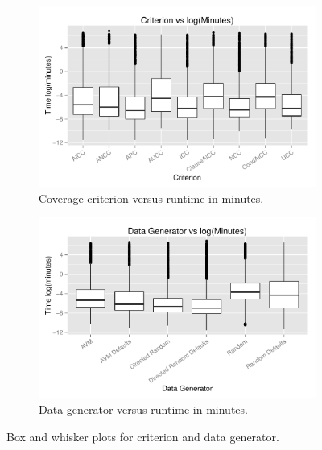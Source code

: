 

\begin{figure}
\centering
\begin{subfigure}{0.5\textwidth}
  \centering
  \includegraphics[width=1\linewidth]{diagrams/CriterionvsTime.pdf}
  \caption{Coverage criterion versus runtime in minutes.}
  \label{fig:crites}
\end{subfigure}%
\begin{subfigure}{0.5\textwidth}
  \centering
  \includegraphics[width=1\linewidth]{diagrams/DataGeneratorvsTime.pdf}
  \caption{Data generator versus runtime in minutes.}
  \label{fig:datas}
\end{subfigure}
\label{fig:bwplots}
\caption{Box and whisker plots for criterion and data
  generator.}
\end{figure}

